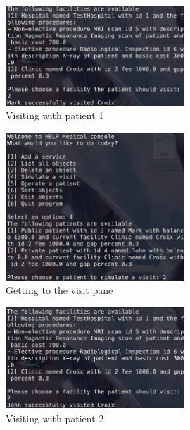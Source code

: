 \documentclass{article}
\begin{document}
	\begin{figure}
		\begin{center}
			\includegraphics[width=0.6\textwidth]{figures/Visiting/Visit_with_patients_02.png}
		\end{center}
		\caption{Visiting with patient 1}\label{fig:visit_with_patients_02}
	\end{figure}

	\begin{figure}
		\begin{center}
			\includegraphics[width=0.6\textwidth]{figures/Visiting/Visit_with_patients_03.png}
		\end{center}
		\caption{Getting to the visit pane}\label{fig:visit_with_patients_03}
	\end{figure}

	\begin{figure}
		\begin{center}
			\includegraphics[width=0.6\textwidth]{figures/Visiting/Visit_with_patients_04.png}
		\end{center}
		\caption{Visiting with patient 2}\label{fig:visit_with_patients_04}
	\end{figure}
\end{document}
